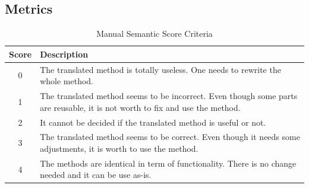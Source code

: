 \subsection{Metrics}

\begin{table}
\begin{tabular}{|c|p{6.5cm}|}
\hline
Score & Description \\
\hline
0 & The translated method is totally useless. One needs to rewrite the whole method. \\
\hline
1 & The translated method seems to be incorrect. Even though some parts are reusable, it is not worth to fix and use the method. \\
\hline
2 &  It cannot be decided if the translated method is useful or not. \\
\hline
3 & The translated method seems to be correct. Even though it needs some adjustments, it is worth to use the method. \\
\hline
4 & The methods are identical in term of functionality. There is no change needed and it can be use as-is. \\
\hline
\end{tabular}
\caption{Manual Semantic Score Criteria}
\label{table:criteria}
\end{table}

